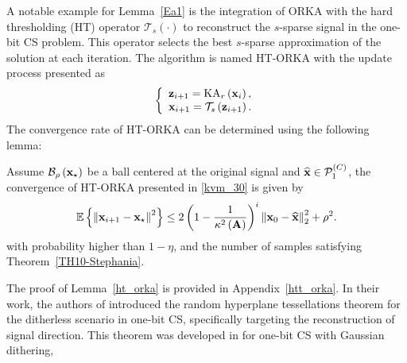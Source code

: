 \documentclass[12pt,draftcls,onecolumn]{IEEEtran}
\begin{document}
A notable example for Lemma~\ref{Ea1} is the integration of ORKA with the hard thresholding (HT) operator $\mathcal{T}_s(\cdot)$ to reconstruct the $s$-sparse signal in the one-bit CS problem.
This operator selects the best $s$-sparse approximation of the solution at each iteration. The algorithm is named HT-ORKA with the update process presented as
\begin{equation}
\label{kvm_30}
\left\{\begin{array}{l}
\mbz_{i+1}=\mathrm{KA}_r\left(\mbx_i\right),\\
\mbx_{i+1} = \mathcal{T}_s\left(\mbz_{i+1}\right).
\end{array}\right.
\end{equation}
The convergence rate of HT-ORKA can be determined using the following lemma:
\begin{lemma}
\label{ht_orka}
Assume $\mathcal{B}_{\rho}\left(\mathbf{x}_{\star}\right)$ be a ball centered at the original signal and $\widehat{\mathbf{x}}\in\mathcal{P}^{(C)}_{1}$, the convergence of HT-ORKA presented in \eqref{kvm_30} is given by
\begin{equation}
\begin{aligned}
\mathbb{E}\left\{\left\|\mathbf{x}_{i+1}-\mathbf{x}_{\star}\right\|^2\right\}\leq 2\left(1-\frac{1}{\kappa^{2}\left(\mathbf{A}\right)}\right)^{i} \left\|\mathbf{x}_{0}-\widehat{\mathbf{x}}\right\|^2_2+\rho^2. 
\end{aligned}
\end{equation}\normalsize
with probability higher than
$1-\eta$, and the number of samples satisfying Theorem~\ref{TH10-Stephania}.
\end{lemma}
The proof of Lemma~\ref{ht_orka} is provided in Appendix~\ref{htt_orka}.
In their work, the authors of \cite{plan2014dimension} introduced the random hyperplane tessellations theorem for the ditherless scenario in one-bit CS, specifically targeting the reconstruction of signal direction. This theorem was developed in \cite{baraniuk2017exponential} for one-bit CS with Gaussian dithering,
\end{document}
